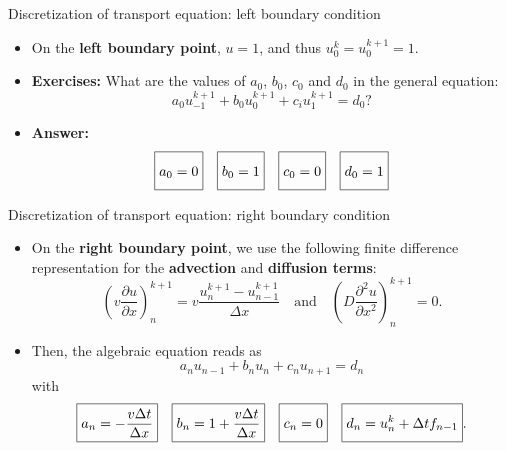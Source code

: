 %
%
\begin{frame}{Discretization of transport equation: left boundary condition}
\begin{itemize}
\item On the \alert{\bf left boundary point}, $u=1$, and thus $u^{k}_{0}  =u^{k+1}_{0} =1.$ 
\item \textbf{Exercises: }What are the values of $a_{0}$, $b_{0}$, $c_{0}$
and $d_{0}$ in the general equation:
\[
a_{0}u_{-1}^{k+1}+b_{0}u_{0}^{k+1}+c_{i}u_{1}^{k+1}=d_{0}?
\]
\hiddenpause
\item \textbf{Answer:} 
\[
\boxed{a_{0}=0\vphantom{\frac{D\Delta t}{\Delta x^{2}}}}\quad\boxed{b_{0}=1\vphantom{\frac{D\Delta t}{\Delta x^{2}}}}\quad\boxed{c_{0}=0\vphantom{\frac{D\Delta t}{\Delta x^{2}}}}\quad\boxed{d_{0}=1\vphantom{\frac{D\Delta t}{\Delta x^{2}}}}
\]
\end{itemize}
\end{frame}
%
%
\begin{frame}{Discretization of transport equation: right boundary condition}

\begin{itemize}
\item On the \alert{\bf right boundary point}, we use the following finite difference representation for the \textbf{advection} and  \textbf{diffusion terms}:
\[
\left(v\frac{\partial u}{\partial x}\right)_{n}^{k+1}=v\frac{u_{n}^{k+1}-u_{n-1}^{k+1}}{\Delta x} 
\quad \mbox{and} \quad
\left(D\frac{\partial^{2}u}{\partial x^{2}}\right)_{n}^{k+1}=0.
\]
\item Then, the algebraic equation reads as
\[
a_{n}u_{n-1} + b_{n}u_{n} + c_{n}u_{n+1} =d_{n}
\]
with
\[
\boxed{a_{n}=-\frac{v\Delta t}{\Delta x}}\quad\boxed{b_{n}=1+\frac{v\Delta t}{\Delta x}}\quad\boxed{c_{n}=0\vphantom{\frac{D\Delta t}{\Delta x^{2}}}}\quad\boxed{d_{n}=u_{n}^{k}+\Delta tf_{n-1}\vphantom{\frac{D\Delta t}{\Delta x^{2}}}}.
\]
\end{itemize}
\end{frame}
